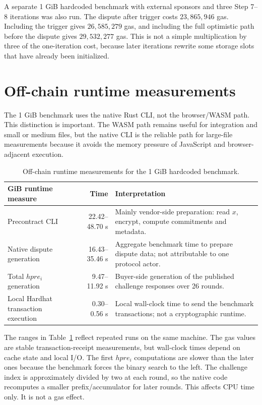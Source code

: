 A separate 1 GiB hardcoded benchmark with external sponsors and three Step 7--8 iterations
was also run. The dispute after trigger costs \(23,865,946\) gas. Including the trigger
gives \(26,585,279\) gas, and including the full optimistic path before the dispute gives
\(29,532,277\) gas. This is not a simple multiplication by three of the one-iteration cost,
because later iterations rewrite some storage slots that have already been initialized.

\section{Off-chain runtime measurements}

The 1 GiB benchmark uses the native Rust CLI, not the browser/WASM path. This distinction is
important. The WASM path remains useful for integration and small or medium files, but the
native CLI is the reliable path for large-file measurements because it avoids the memory
pressure of JavaScript and browser-adjacent execution.

\begin{table}[htbp]
  \centering
  \begin{tabularx}{\linewidth}{>{\raggedright\arraybackslash}Xr>{\raggedright\arraybackslash}X}
    \toprule
    1 GiB runtime measure & Time & Interpretation \\
    \midrule
    Precontract CLI & 22.42--48.70 s & Mainly vendor-side preparation: read \(x\), encrypt,
    compute commitments and metadata. \\
    Native dispute generation & 16.43--35.46 s & Aggregate benchmark time to prepare dispute
    data; not attributable to one protocol actor. \\
    Total \(hpre_i\) generation & 9.47--11.92 s & Buyer-side generation of the published
    challenge responses over 26 rounds. \\
    Local Hardhat transaction execution & 0.30--0.56 s & Local wall-clock time to send the
    benchmark transactions; not a cryptographic runtime. \\
    \bottomrule
  \end{tabularx}
  \caption{Off-chain runtime measurements for the 1 GiB hardcoded benchmark.}
  \label{tab:offchain-runtime-1gib}
\end{table}

The ranges in Table~\ref{tab:offchain-runtime-1gib} reflect repeated runs on the same
machine. The gas values are stable transaction-receipt measurements, but wall-clock times
depend on cache state and local I/O. The first \(hpre_i\) computations are slower than the later ones because the benchmark
forces the binary search to the left. The challenge index is approximately divided by two
at each round, so the native code recomputes a smaller prefix/accumulator for later rounds.
This affects CPU time only. It is not a gas effect.

